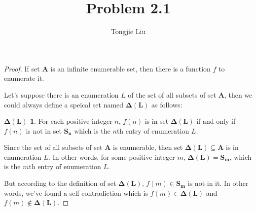 \documentclass{article}
\title{Problem 2.1}
\author{Tongjie Liu}
\theoremstyle{definition} \newtheorem*{def-delta-l}{$\mathbf{\Delta(L)}$}
\begin{document}
\maketitle


\begin{proof}
	If set $\mathbf{A}$ is an infinite enumerable set, then there is
a function $f$ to enumerate it.

	Let's suppose there is an enumeration $L$ of the set of all subsets
of set $\mathbf{A}$, then we could always define a speical set named
$\mathbf{\Delta(L)}$ as follows:
	\begin{def-delta-l}
		For each positive integer $n$, $f(n)$ is in set $\mathbf{
	\Delta(L)}$ if and only if $f(n)$ is not in set $\mathbf{S_n}$ which
	is the $n$th entry of enumeration $L$.
	\end{def-delta-l}

	Since the set of all subsets of set $\mathbf{A}$ is enumerable, then
set $\mathbf{\Delta(L)} \subseteq \mathbf{A}$ is in enumeration $L$. In other
words, for some positive integer $m$, $\mathbf{\Delta(L)} = \mathbf{S_m}$,
which is the $m$th entry of enumeration $L$.

	But according to the definition of set $\mathbf{\Delta(L)}$, $f(m) \in
\mathbf{S_m}$ is not in it. In other words, we've found a self-contradiction
which is $f(m) \in \mathbf{\Delta(L)}$ and $f(m) \notin \mathbf{\Delta(L)}$.
\end{proof}
\end{document}
